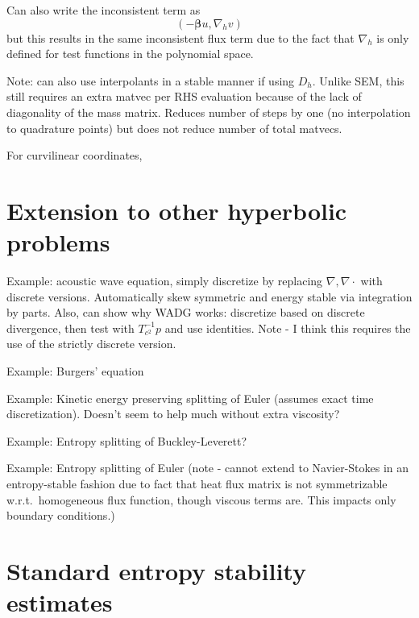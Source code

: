 \documentclass[preprint,10pt]{article}
\newcommand{\LRp}[1]{\left( #1 \right)}
\newcommand{\LRa}[1]{\left\langle #1 \right\rangle}
\newcommand{\LRc}[1]{\left\{ #1 \right\}}
\newcommand{\Grad} {\ensuremath{\nabla}}
\newcommand{\avg}[1] {\ensuremath{\LRc{\!\{#1\}\!}}}
\begin{document}
Can also write the inconsistent term as 
\[
\LRp{-{ \bm{\beta}u},\Grad_h v} %
\]
but this results in the same inconsistent flux term due to the fact that $\Grad_h$ is only defined for test functions in the polynomial space.  

Note: can also use interpolants in a stable manner if using $D_h$.  Unlike SEM, this still requires an extra matvec per RHS evaluation because of the lack of diagonality of the mass matrix.  Reduces number of steps by one (no interpolation to quadrature points) but does not reduce number of total matvecs.  

For curvilinear coordinates, 



\section{Extension to other hyperbolic problems}

Example: acoustic wave equation, simply discretize by replacing $\Grad, \Grad\cdot$ with discrete versions.  Automatically skew symmetric and energy stable via integration by parts.  Also, can show why WADG works: discretize based on discrete divergence, then test with $T_{c^2}^{-1}p$ and use identities.  Note - I think this requires the use of the strictly discrete version.  

Example: Burgers' equation

Example: Kinetic energy preserving splitting of Euler (assumes exact time discretization).  Doesn't seem to help much without extra viscosity?  

Example: Entropy splitting of Buckley-Leverett?

Example: Entropy splitting of Euler (note - cannot extend to Navier-Stokes in an entropy-stable fashion due to fact that heat flux matrix is not symmetrizable w.r.t.\ homogeneous flux function, though viscous terms are.  This impacts only boundary conditions.) 

\section{Standard entropy stability estimates}
\end{document}
